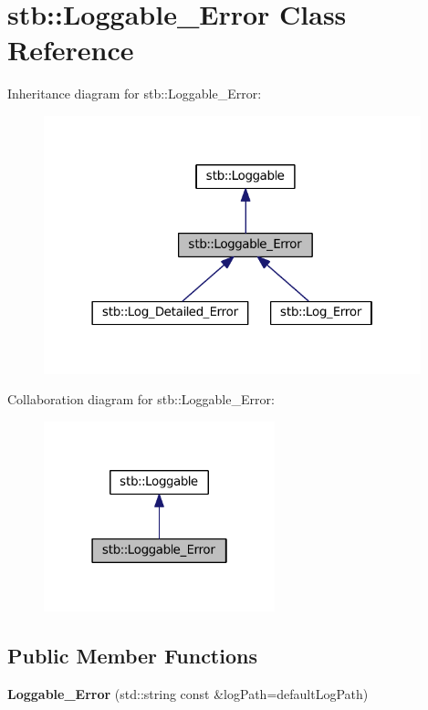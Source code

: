 \hypertarget{classstb_1_1Loggable__Error}{\section{stb\+:\+:Loggable\+\_\+\+Error Class Reference}
\label{classstb_1_1Loggable__Error}
}


Inheritance diagram for stb\+:\+:Loggable\+\_\+\+Error\+:
\nopagebreak
\begin{figure}[H]
\begin{center}
\leavevmode
\includegraphics[width=310pt]{classstb_1_1Loggable__Error__inherit__graph}
\end{center}
\end{figure}


Collaboration diagram for stb\+:\+:Loggable\+\_\+\+Error\+:
\nopagebreak
\begin{figure}[H]
\begin{center}
\leavevmode
\includegraphics[width=190pt]{classstb_1_1Loggable__Error__coll__graph}
\end{center}
\end{figure}
\subsection*{Public Member Functions}
\begin{DoxyCompactItemize}
\item 
\hypertarget{classstb_1_1Loggable__Error_ae783826e0d12003e9fa9466abc631127}{{\bfseries Loggable\+\_\+\+Error} (std\+::string const \&log\+Path=default\+Log\+Path)}\label{classstb_1_1Loggable__Error_ae783826e0d12003e9fa9466abc631127}

\end{DoxyCompactItemize}
